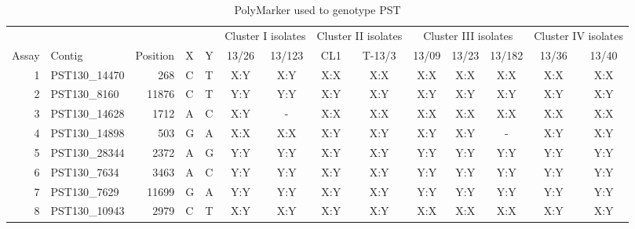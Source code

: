 
\begin{sidewaystable}
\centering
\caption{PolyMarker used to genotype PST}
\label{app:PolyMarkerPST}
\begin{localsize}{6}{7}

\begin{tabular}{rlrll|cc|cc|ccc|cc}
\toprule
          &              &  &  & & \multicolumn{2}{c}{Cluster I isolates}        & \multicolumn{2}{c}{Cluster II isolates}        & \multicolumn{3}{c}{Cluster III isolates}         & \multicolumn{2}{c}{Cluster IV isolates}        \\
Assay & Contig       & Position &  X &  Y & 13/26              & 13/123 & CL1                 & T-13/3 & 13/09                & 13/23 & 13/182 & 13/36               & 13/40 \\
 \midrule
  1  & PST130\_14470 & 268      & C        & T        & X:Y                & X:Y    & X:X                 & X:X    & X:X                  & X:X   & X:X    & X:X                 & X:X   \\
  2  & PST130\_8160  & 11876    & C        & T        & Y:Y                & Y:Y    & X:Y                 & X:Y    & X:Y                  & X:Y   & X:Y    & X:Y                 & X:Y   \\
  3  & PST130\_14628 & 1712     & A        & C        & X:Y                & -      & X:X                 & X:X    & X:X                  & X:X   & X:X    & X:X                 & X:X   \\
  4  & PST130\_14898 & 503      & G        & A        & X:X                & X:X    & X:Y                 & X:Y    & X:Y                  & X:Y   & -      & X:Y                 & X:Y   \\
  5  & PST130\_28344 & 2372     & A        & G        & Y:Y                & Y:Y    & X:Y                 & X:Y    & Y:Y                  & Y:Y   & Y:Y    & Y:Y                 & Y:Y   \\
  6  & PST130\_7634  & 3463     & A        & C        & Y:Y                & Y:Y    & X:Y                 & X:Y    & Y:Y                  & Y:Y   & Y:Y    & Y:Y                 & Y:Y   \\
  7  & PST130\_7629  & 11699    & G        & A        & Y:Y                & Y:Y    & X:Y                 & X:Y    & Y:Y                  & Y:Y   & Y:Y    & Y:Y                 & Y:Y   \\
  8  & PST130\_10943 & 2979     & C        & T        & X:Y                & X:Y    & X:Y                 & X:Y    & X:X                  & X:X   & X:X    & X:Y                 & X:Y   \\

\end{tabular}
\end{localsize}
\end{sidewaystable}
